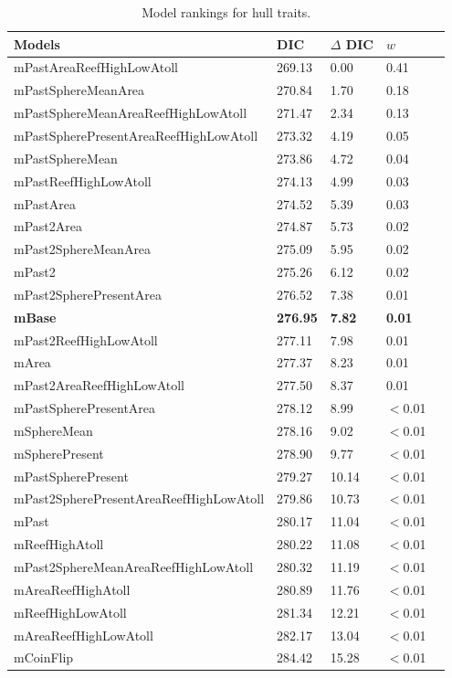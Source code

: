 \begin{table}
\begin{center}
\begin{tabular}{lllll}
Models & DIC & $\Delta$ DIC & $w$\\
\hline
mPastAreaReefHighLowAtoll & 269.13 & 0.00 & 0.41\\
mPastSphereMeanArea & 270.84 & 1.70 & 0.18\\
mPastSphereMeanAreaReefHighLowAtoll & 271.47 & 2.34 & 0.13\\
mPastSpherePresentAreaReefHighLowAtoll & 273.32 & 4.19 & 0.05\\
mPastSphereMean & 273.86 & 4.72 & 0.04\\
mPastReefHighLowAtoll & 274.13 & 4.99 & 0.03\\
mPastArea & 274.52 & 5.39 & 0.03\\
mPast2Area & 274.87 & 5.73 & 0.02\\
mPast2SphereMeanArea & 275.09 & 5.95 & 0.02\\
mPast2 & 275.26 & 6.12 & 0.02\\
mPast2SpherePresentArea & 276.52 & 7.38 & 0.01\\
\textbf{mBase} & \textbf{276.95} & \textbf{7.82} & \textbf{0.01}\\
mPast2ReefHighLowAtoll & 277.11 & 7.98 & 0.01\\
mArea & 277.37 & 8.23 & 0.01\\
mPast2AreaReefHighLowAtoll & 277.50 & 8.37 & 0.01\\
mPastSpherePresentArea & 278.12 & 8.99 & $<$0.01\\
mSphereMean & 278.16 & 9.02 & $<$0.01\\
mSpherePresent & 278.90 & 9.77 & $<$0.01\\
mPastSpherePresent & 279.27 & 10.14 & $<$0.01\\
mPast2SpherePresentAreaReefHighLowAtoll & 279.86 & 10.73 & $<$0.01\\
mPast & 280.17 & 11.04 & $<$0.01\\
mReefHighAtoll & 280.22 & 11.08 & $<$0.01\\
mPast2SphereMeanAreaReefHighLowAtoll & 280.32 & 11.19 & $<$0.01\\
mAreaReefHighAtoll & 280.89 & 11.76 & $<$0.01\\
mReefHighLowAtoll & 281.34 & 12.21 & $<$0.01\\
mAreaReefHighLowAtoll & 282.17 & 13.04 & $<$0.01\\
mCoinFlip & 284.42 & 15.28 & $<$0.01\\
\end{tabular}
\end{center}
\caption{Model rankings for hull traits.
\label{resultstable4}}
\end{table}


